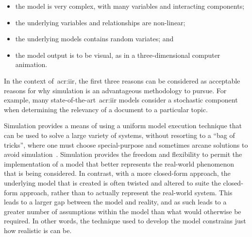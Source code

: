 \begin{itemize}
    \item{the model is very complex, with many variables and interacting components;}
    \item{the underlying variables and relationships are non-linear;}
    \item{the underlying models contains random variates; and}
    \item{the model output is to be visual, as in a three-dimensional computer animation.}
\end{itemize}

In the context of~\gls{acr:iir}, the first three reasons can be considered as acceptable reasons for why simulation is an advantageous methodology to pursue. For example, many state-of-the-art~\gls{acr:iir} models consider a stochastic component when determining the relevancy of a document to a particular topic.

Simulation provides a means of using a uniform model execution technique that can be used to solve a large variety of systems, without resorting to a ``bag of tricks'', where one must choose special-purpose and sometimes arcane solutions to avoid simulation~\citep{fishwick1995simulation}. Simulation provides the freedom and flexibility to permit the implementation of a model that better represents the real-world phenomenon that is being considered. In contrast, with a more closed-form approach, the underlying model that is created is often twisted and altered to suite the closed-form approach, rather than to actually represent the real-world system. This leads to a larger gap between the model and reality, and as such leads to a greater number of assumptions within the model than what would otherwise be required. In other words, the technique used to develop the model constrains just how realistic is can be.

